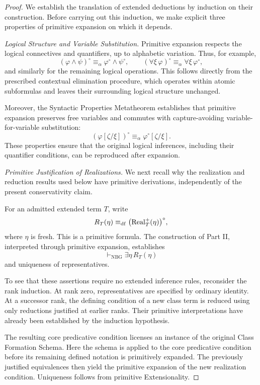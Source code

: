 \begin{proof}
We establish the translation of extended deductions by
induction on their construction. Before carrying out this
induction, we make explicit three properties of primitive
expansion on which it depends.

\medskip
\noindent\emph{Logical Structure and Variable Substitution.}
Primitive expansion respects the logical connectives and
quantifiers, up to alphabetic variation. Thus, for example,
\[
(\varphi\land\psi)^\circ
\equiv_\alpha
\varphi^\circ\land\psi^\circ,
\qquad
(\forall\xi\,\varphi)^\circ
\equiv_\alpha
\forall\xi\,\varphi^\circ,
\]
and similarly for the remaining logical operations.
This follows directly from the prescribed contextual
elimination procedure, which operates within atomic
subformulas and leaves their surrounding logical
structure unchanged.

Moreover, the Syntactic Properties Metatheorem
establishes that primitive expansion preserves free
variables and commutes with capture-avoiding
variable-for-variable substitution:
\[
(\varphi[\zeta/\xi])^\circ
\equiv_\alpha
\varphi^\circ[\zeta/\xi].
\]
These properties ensure that the original logical
inferences, including their quantifier conditions,
can be reproduced after expansion.

\medskip
\noindent\emph{Primitive Justification of Realizations.}
We next recall why the realization and reduction
results used below have primitive derivations,
independently of the present conservativity claim.

For an admitted extended term \(T\), write
\[
R_T(\eta)\mathrel{\equiv_{\mathrm{df}}}
\bigl(\operatorname{Real}_T^+(\eta)\bigr)^\circ,
\]
where \(\eta\) is fresh. This is a primitive formula.
The construction of Part II, interpreted through
primitive expansion, establishes
\[
\vdash_{\mathrm{NBG}}\exists\eta\,R_T(\eta)
\]
and uniqueness of representatives.

To see that these assertions require no extended
inference rules, reconsider the rank induction.
At rank zero, representatives are specified by
ordinary identity. At a successor rank, the
defining condition of a new class term is reduced
using only reductions justified at earlier ranks.
Their primitive interpretations have already
been established by the induction hypothesis.

The resulting core predicative condition licenses
an instance of the original Class Formation Schema.
Here the schema is applied to the core predicative
condition before its remaining defined notation
is primitively expanded. The previously justified
equivalences then yield the primitive expansion
of the new realization condition. Uniqueness
follows from primitive Extensionality.


\end{proof}
